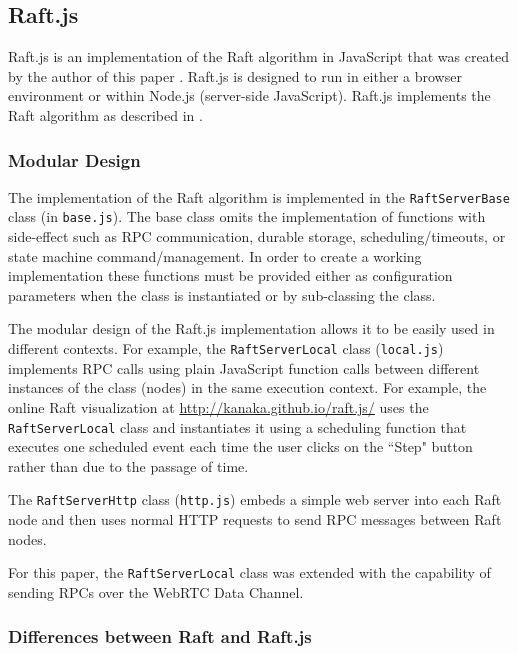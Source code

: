 \documentclass[9pt]{extarticle}
\begin{document}
\begin{multicols}{2}

\subsection{Raft.js}

Raft.js is an implementation of the Raft algorithm in JavaScript that
was created by the author of this paper \cite{raft.js}.  Raft.js is
designed to run in either a browser environment or within Node.js
(server-side JavaScript). Raft.js implements the Raft algorithm as
described in \cite[Consensus:~Diego]{raft_thesis:ongaro14}.

\subsubsection{Modular Design}

The implementation of the Raft algorithm is implemented in the
\texttt{RaftServerBase} class (in \texttt{base.js}). The base class
omits the implementation of functions with side-effect such as RPC
communication, durable storage, scheduling/timeouts, or state machine
command/management. In order to create a working implementation these
functions must be provided either as configuration parameters when the
class is instantiated or by sub-classing the class.

The modular design of the Raft.js implementation allows it to be
easily used in different contexts. For example, the \texttt{RaftServerLocal}
class (\texttt{local.js}) implements RPC calls using plain JavaScript function
calls between different instances of the class (nodes) in the same
execution context. For example, the online Raft visualization at
\href{http://kanaka.github.io/raft.js/}{http://kanaka.github.io/raft.js/}
\cite{raft.js:visualization} uses the \texttt{RaftServerLocal} class
and instantiates it using a scheduling function that executes one
scheduled event each time the user clicks on the ``Step" button rather
than due to the passage of time.

The \texttt{RaftServerHttp} class (\texttt{http.js}) embeds a simple
web server into each Raft node and then uses normal HTTP requests to
send RPC messages between Raft nodes.

For this paper, the \texttt{RaftServerLocal} class was extended with
the capability of sending RPCs over the WebRTC Data Channel.

\subsubsection{Differences between Raft and Raft.js}


\end{multicols}
\end{document}
